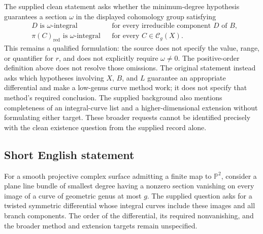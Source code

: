 \documentclass[11pt]{article}
\newcommand{\PP}{\mathbb{P}}
\begin{document}
The supplied clean statement asks whether the minimum-degree hypothesis guarantees a section \(\omega\) in the displayed cohomology group satisfying
\[
\begin{aligned}
& D\text{ is }\omega\text{-integral}
&&\text{for every irreducible component }D\text{ of }B,\\
& \pi(C)_{\mathrm{red}}\text{ is }\omega\text{-integral}
&&\text{for every }C\in\mathcal C_g(X).
\end{aligned}
\]
This remains a qualified formulation: the source does not specify the value, range, or quantifier for \(r\), and does not explicitly require \(\omega\ne0\). The positive-order definition above does not resolve those omissions. The original statement instead asks which hypotheses involving \(X\), \(B\), and \(L\) guarantee an appropriate differential and make a low-genus curve method work; it does not specify that method's required conclusion. The supplied background also mentions completeness of an integral-curve list and a higher-dimensional extension without formulating either target. These broader requests cannot be identified precisely with the clean existence question from the supplied record alone.
\subsection{Short English statement}
For a smooth projective complex surface admitting a finite map to \(\PP^2\), consider a plane line bundle of smallest degree having a nonzero section vanishing on every image of a curve of geometric genus at most \(g\). The supplied question asks for a twisted symmetric differential whose integral curves include these images and all branch components. The order of the differential, its required nonvanishing, and the broader method and extension targets remain unspecified.
\end{document}
